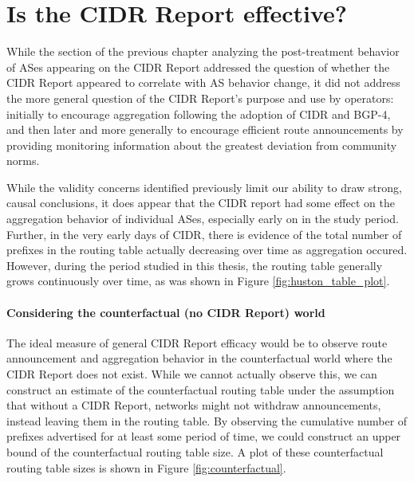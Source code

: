 \section{Is the CIDR Report effective?}
While the section of the previous chapter analyzing the post-treatment behavior
of ASes appearing on the CIDR Report addressed the question of whether the CIDR
Report appeared to correlate with AS behavior change, it did not address the
more general question of the CIDR Report's purpose and use by operators:
initially to encourage aggregation following the adoption of CIDR and BGP-4,
and then later and more generally to encourage efficient route announcements by
providing monitoring information about the greatest deviation from community
norms.

While the validity concerns identified previously limit our ability to draw
strong, causal conclusions, it does appear that the CIDR report had some effect
on the aggregation behavior of individual ASes, especially early on in the
study period. Further, in the very early days of CIDR, there is evidence of the
total number of prefixes in the routing table actually decreasing over time as
aggregation occured. However, during the period studied in this thesis, the
routing table generally grows continuously over time, as was shown in Figure
\ref{fig:huston_table_plot}.

\paragraph{Considering the counterfactual (no CIDR Report) world}
The ideal measure of general CIDR Report efficacy would be to observe route
announcement and aggregation behavior in the counterfactual world where the
CIDR Report does not exist. While we cannot actually observe this, we can
construct an estimate of the counterfactual routing table under the assumption
that without a CIDR Report, networks might not withdraw announcements, instead
leaving them in the routing table. By observing the cumulative number of
prefixes advertised for at least some period of time, we could construct an
upper bound of the counterfactual routing table size. A plot of these
counterfactual routing table sizes is shown in Figure \ref{fig:counterfactual}.

